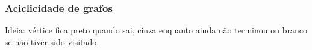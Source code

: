 \subsubsection{Aciclicidade de grafos}

Ideia: vértice fica preto quando sai, cinza enquanto ainda não terminou
ou branco se não tiver sido visitado.

